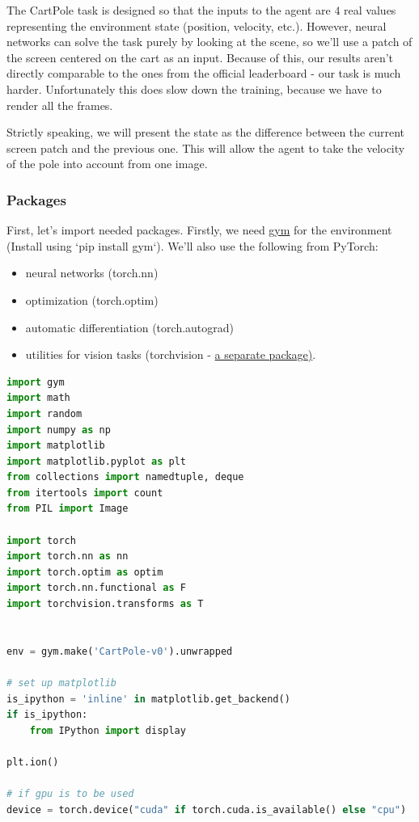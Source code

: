 The CartPole task is designed so that the inputs to the agent are $4$ real values 
representing the environment state (position, velocity, etc.). However, neural 
networks can solve the task purely by looking at the scene, so we'll use a patch of 
the screen centered on the cart as an input. Because of this, our results aren't 
directly comparable to the ones from the official leaderboard - our task is much harder. 
Unfortunately this does slow down the training, because we have to render all the frames.

Strictly speaking, we will present the state as the difference between the current 
screen patch and the previous one. This will allow the agent to take the velocity of 
the pole into account from one image.

\subsubsection{Packages}

First, let's import needed packages. Firstly, we need \href{https://github.com/openai/gym}{gym} 
for the environment (Install using `pip install gym`). We'll also use the following from 
PyTorch:
\begin{itemize}
\setlength{\parskip}{0pt}
\item
neural networks (torch.nn)

\item
optimization (torch.optim)

\item
automatic differentiation (torch.autograd)

\item
utilities for vision tasks (torchvision - \href{https://github.com/pytorch/vision}{a separate package)}.
\end{itemize}

\begin{lstlisting}[language=Python]
import gym
import math
import random
import numpy as np
import matplotlib
import matplotlib.pyplot as plt
from collections import namedtuple, deque
from itertools import count
from PIL import Image

import torch
import torch.nn as nn
import torch.optim as optim
import torch.nn.functional as F
import torchvision.transforms as T


env = gym.make('CartPole-v0').unwrapped

# set up matplotlib
is_ipython = 'inline' in matplotlib.get_backend()
if is_ipython:
    from IPython import display

plt.ion()

# if gpu is to be used
device = torch.device("cuda" if torch.cuda.is_available() else "cpu")
\end{lstlisting}


